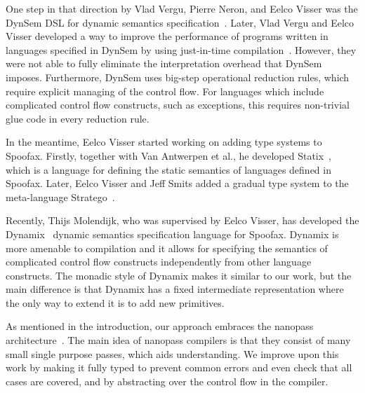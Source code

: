 \documentclass[a4paper,UKenglish,cleveref, autoref, thm-restate, anonymous]{oasics-v2021}
\begin{document}
One step in that direction by Vlad Vergu, Pierre Neron, and Eelco Visser was the DynSem DSL for dynamic semantics specification~\cite{vergu_et_al:LIPIcs:2015:5208}.
Later, Vlad Vergu and Eelco Visser developed a way to improve the performance of programs written in languages specified in DynSem by using just-in-time compilation~\cite{10.1145/3237009.3237018}.
However, they were not able to fully eliminate the interpretation overhead that DynSem imposes.
Furthermore, DynSem uses big-step operational reduction rules, which require explicit managing of the control flow.
For languages which include complicated control flow constructs, such as exceptions, this requires non-trivial glue code in every reduction rule.

In the meantime, Eelco Visser started working on adding type systems to Spoofax.
Firstly, together with Van Antwerpen et al., he developed Statix~\cite{10.1145/3276484}, which is a language for defining the static semantics of languages defined in Spoofax.
Later, Eelco Visser and Jeff Smits added a gradual type system to the meta-language Stratego~\cite{10.1145/3426425.3426928}.

Recently, Thijs Molendijk, who was supervised by Eelco Visser, has developed the Dynamix~\cite{dynamix} dynamic semantics specification language for Spoofax.
Dynamix is more amenable to compilation and it allows for specifying the semantics of complicated control flow constructs independently from other language constructs.
The monadic style of Dynamix makes it similar to our work, but the main difference is that Dynamix has a fixed intermediate representation where the only way to extend it is to add new primitives.

As mentioned in the introduction, our approach embraces the nanopass architecture~\cite{10.1145/1016850.1016878, 10.1145/2544174.2500618}.
The main idea of nanopass compilers is that they consist of many small single purpose passes, which aids understanding.
We improve upon this work by making it fully typed to prevent common errors and even check that all cases are covered, and by abstracting over the control flow in the compiler.

\end{document}
